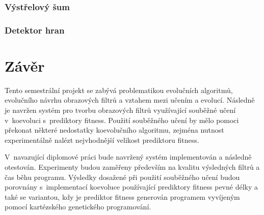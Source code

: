 


\subsection{Výstřelový šum}

\subsection{Detektor hran}



\chapter{Závěr}
\label{chConclusions}

Tento semestrální projekt se zabývá problematikou evolučních algoritmů, evolučního návrhu obrazových filtrů a vztahem mezi učením a evolucí. Následně je navržen systém pro tvorbu obrazových filtrů využívající souběžné učení v~koevoluci s~prediktory fitness. Použití souběžného učení by mělo pomoci překonat některé nedostatky koevolučního algoritmu, zejména nutnost experimentálně nalézt nejvhodnější velikost prediktoru fitness.


V~navazující diplomové práci bude navržený systém implementován a následně otestován. Experimenty budou zaměřeny především na kvalitu výsledných filtrů a čas běhu programu. Výsledky dosažené při použití souběžného učení budou porovnány s~implementací koevoluce používající prediktory fitness pevné délky a také se variantou, kdy je prediktor fitness generován programem vyvíjeným pomocí kartézského genetického programování.
